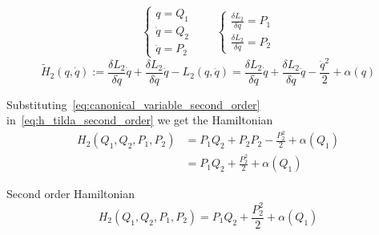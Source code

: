 \begin{frame}
  \begin{equation}\label{eq:canonical_variable_second_order}
    \begin{cases}
      q        = Q_1 \\
      \dot{q}  = Q_2 \\
      \ddot{q} = P_2
    \end{cases}
    \qquad
    \begin{cases}
      \frac{\delta L_2}{\delta \dot{q}}  = P_1 \\
      \frac{\delta L_2}{\delta \ddot{q}} = P_2
    \end{cases}
  \end{equation}
  \begin{equation}\label{eq:h_tilda_second_order}
    \tilde{H}_2(q, \dot{q}) :=
      \frac{\delta L_2}{\delta \dot{q}} \dot{q} +
      \frac{\delta L_2}{\delta \ddot{q}} \ddot{q} -
      L_2(q, \ddot{q})
      = \frac{\delta L_2}{\delta \dot{q}} \dot{q} +
      \frac{\delta L_2}{\delta \ddot{q}} \ddot{q} -
      \frac{\ddot{q}^2}{2} + \alpha(q)
  \end{equation}

  Substituting~\eqref{eq:canonical_variable_second_order}
  in~\eqref{eq:h_tilda_second_order} we get the Hamiltonian
  \begin{align*} \label{eq: second-order_motion_eq_ham}
    H_2(Q_1, Q_2, P_1, P_2)
      &= P_1 Q_2 + P_2 P_2 - \frac{P_2^2}{2} + \alpha(Q_1) \\
      &= P_1 Q_2 + \frac{P_2^2}{2} + \alpha(Q_1)
  \end{align*}

  \begin{block}{Second order Hamiltonian}
    \begin{equation*} \label{eq: second-order_motion_eq_ham}
      H_2(Q_1, Q_2, P_1, P_2) = P_1Q_2 + \frac{P_2^2}{2} + \alpha(Q_1)
    \end{equation*}
  \end{block}
\end{frame}

